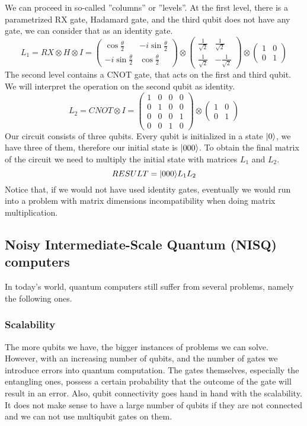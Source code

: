 We can proceed in so-called ''columns'' or ''levels''.
At the first level, there is a parametrized RX gate, Hadamard gate, and the third qubit does not have any gate, we can consider that as an identity gate.
$$L_1 = RX \otimes H \otimes I = \begin{pmatrix} 
\cos{\frac{\theta}{2}} & -i\sin{\frac{\theta}{2}} \\
-i\sin{\frac{\theta}{2}} & \cos{\frac{\theta}{2}}
\end{pmatrix} \otimes \begin{pmatrix} 
\frac{1}{\sqrt{2}} &  \frac{1}{\sqrt{2}}  \\
\frac{1}{\sqrt{2}}  &  -\frac{1}{\sqrt{2}} 
\end{pmatrix} \otimes \begin{pmatrix} 
1 & 0 \\
0 & 1
\end{pmatrix}$$
The second level contains a CNOT gate, that acts on the first and third qubit. We will interpret the operation on the second qubit as identity. 
$$ L_2 = CNOT \otimes I = \begin{pmatrix}
1 & 0 & 0 & 0 \\
0 & 1 & 0 & 0 \\
0 & 0 & 0 & 1 \\
0 & 0 & 1 & 0
\end{pmatrix}\otimes\begin{pmatrix} 
1 & 0 \\
0 & 1
\end{pmatrix}$$
Our circuit consists of three qubits. Every qubit is initialized in a state $\lvert0\rangle$, we have three of them, therefore our initial state is $\lvert000\rangle$. To obtain the final matrix of the circuit we need to multiply the initial state with matrices $L_1$ and $L_2$.
$$RESULT = \lvert000\rangle L_{1}L_2$$
Notice that, if we would not have used identity gates, eventually we would run into a problem with matrix dimensions incompatibility when doing matrix multiplication.

\subsection{Noisy Intermediate-Scale Quantum (NISQ) computers}
In today's world, quantum computers still suffer from several problems, namely the following ones.

\subsubsection{Scalability}
The more qubits we have, the bigger instances of problems we can solve. However, with an increasing number of qubits, and the number of gates we introduce errors into quantum computation. The gates themselves, especially the entangling ones, possess a certain probability that the outcome of the gate will result in an error. Also, qubit connectivity goes hand in hand with the scalability. It does not make sense to have a large number of qubits if they are not connected and we can not use multiqubit gates on them.

